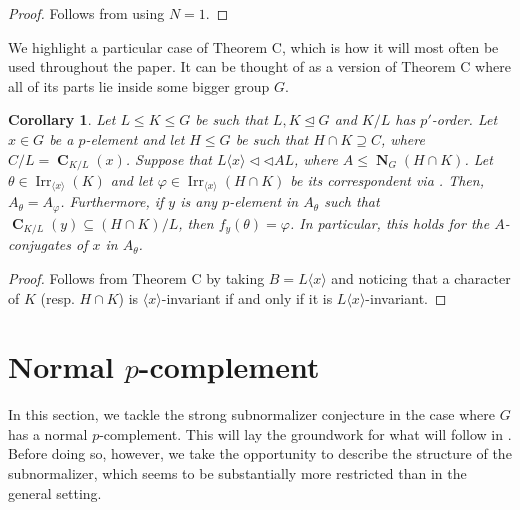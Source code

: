 \documentclass[12pt]{amsart}
\DeclareMathOperator{\CB}{\mathbf{C}}
\DeclareMathOperator{\NB}{\mathbf{N}}
\DeclareMathOperator{\Irr}{Irr}
\theoremstyle{remark}
\theoremstyle{definition}
\theoremstyle{plain}
\newtheorem{cor}[thm]{Corollary}
\theoremstyle{definition}
\numberwithin{equation}{section}
\begin{document}
\begin{proof}
	Follows from  using $N = 1$.
\end{proof}

We highlight a particular case of Theorem C, which is how it will most often be used throughout the paper. It can be thought of as a version of Theorem C where all of its parts lie inside some bigger group $G$.

\begin{cor}
	\label{inertiaGroupLemma}
	Let $L \leq K \leq G$ be such that $L, K \unlhd G$ and $K/L$ has $p'$-order. Let $x \in G$ be a $p$-element and let $H \leq G$ be such that $H \cap K \supseteq C$, where $C/L = \CB_{K/L}(x)$. Suppose that $L\langle x \rangle {\triangleleft}{\triangleleft} AL$, where $A \leq \NB_G(H \cap K)$. Let $\theta \in \Irr_{\langle x \rangle}(K)$ and let $\varphi \in \Irr_{\langle x \rangle}(H \cap K)$ be its correspondent via . Then, $A_\theta = A_\varphi$. Furthermore, if $y$ is any $p$-element in $A_\theta$ such that $\CB_{K/L}(y) \subseteq (H \cap K)/L$, then $f_y(\theta) = \varphi$. In particular, this holds for the $A$-conjugates of $x$ in $A_\theta$.
\end{cor}

\begin{proof}
	Follows from Theorem C by taking $B = L\langle x \rangle$ and noticing that a character of $K$ (resp. $H \cap K$) is $\langle x \rangle$-invariant if and only if it is $L\langle x \rangle$-invariant.
\end{proof}

\section{Normal $p$-complement}
\label{Section 3}

In this section, we tackle the strong subnormalizer conjecture in the case where $G$ has a normal $p$-complement. This will lay the groundwork for what will follow in . Before doing so, however, we take the opportunity to describe the structure of the subnormalizer, which seems to be substantially more restricted than in the general setting.
\end{document}
